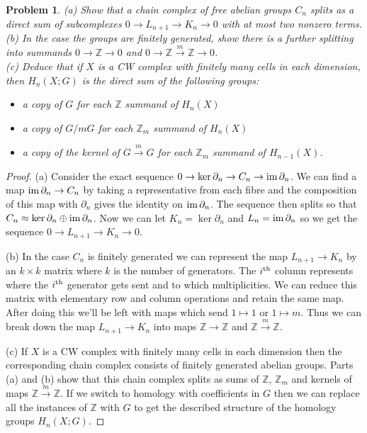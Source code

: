 \documentclass{article}
\newtheorem{problem}{Problem}
\newcommand{\im}{\textup{im}\,}
\begin{document}
\begin{problem}
(a) Show that a chain complex of free abelian groups $C_n$ splits as a direct sum of subcomplexes $0 \to L_{n+1} \to K_n \to 0$ with at most two nonzero terms.\\
(b) In the case the groups are finitely generated, show there is a further splitting into summands $0 \to \mathbb{Z} \to 0$ and $0 \to \mathbb{Z} \stackrel{m}{\to} \mathbb{Z} \to 0$.\\
(c) Deduce that if $X$ is a CW complex with finitely many cells in each dimension, then $H_n(X;G)$ is the direct sum of the following groups:
\begin{itemize}
\item a copy of $G$ for each $\mathbb{Z}$ summand of $H_n(X)$
\item a copy of $G/mG$ for each $\mathbb{Z}_m$ summand of $H_n(X)$
\item a copy of the kernel of $G \stackrel{m}{\to} G$ for each $\mathbb{Z}_m$ summand of $H_{n-1}(X)$.
\end{itemize}
\end{problem}
\begin{proof}
(a) Consider the exact sequence $0 \to \ker \partial_n \to C_n \to \im \partial_n$. We can find a map $\im \partial_n \to C_n$ by taking a representative from each fibre and the composition of this map with $\partial_n$ gives the identity on $\im \partial_n$. The sequence then splits so that $C_n \approx \ker \partial_n \oplus \im \partial_n$. Now we can let $K_n = \ker \partial_n$ and $L_n = \im \partial_n$ so we get the sequence $0 \to L_{n+1} \to K_n \to 0$.

(b) In the case $C_n$ is finitely generated we can represent the map $L_{n+1} \to K_n$ by an $k \times k$ matrix where $k$ is the number of generators. The $i^{\textup{th}}$ column represents where the $i^{\textup{th}}$ generator gets sent and to which multiplicities. We can reduce this matrix with elementary row and column operations and retain the same map. After doing this we'll be left with maps which send $1 \mapsto 1$ or $1 \mapsto m$. Thus we can break down the map $L_{n+1} \to K_n$ into maps $\mathbb{Z} \to \mathbb{Z}$ and $\mathbb{Z} \stackrel{m}{\to} \mathbb{Z}$.

(c) If $X$ is a CW complex with finitely many cells in each dimension then the corresponding chain complex consists of finitely generated abelian groups. Parts (a) and (b) show that this chain complex splits as sums of $\mathbb{Z}$, $\mathbb{Z}_m$ and kernels of maps $\mathbb{Z} \stackrel{m}{\to} \mathbb{Z}$. If we switch to homology with coefficients in $G$ then we can replace all the instances of $\mathbb{Z}$ with $G$ to get the described structure of the homology groups $H_n(X;G)$.
\end{proof}
\end{document}
